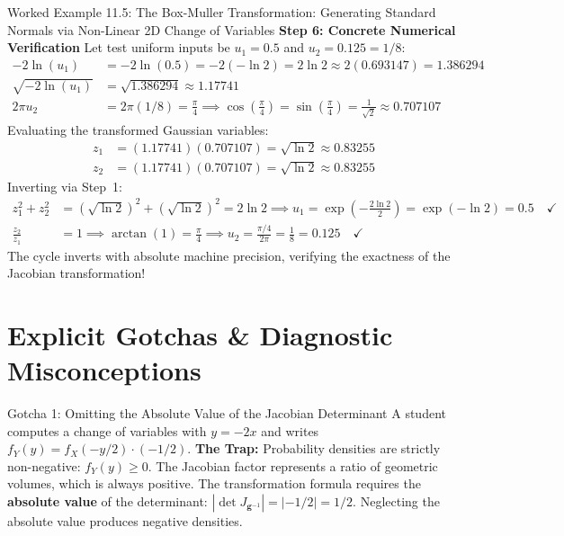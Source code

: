 \begin{examplebox}[breakable]{Worked Example 11.5: The Box-Muller Transformation: Generating Standard Normals via Non-Linear 2D Change of Variables}
\textbf{Step 6: Concrete Numerical Verification}
Let test uniform inputs be $u_1 = 0.5$ and $u_2 = 0.125 = 1/8$:
\begin{align}
-2\ln(u_1) &= -2\ln(0.5) = -2(-\ln 2) = 2\ln 2 \approx 2(0.693147) = 1.386294 \\
\sqrt{-2\ln(u_1)} &= \sqrt{1.386294} \approx 1.17741 \\
2\pi u_2 &= 2\pi(1/8) = \frac{\pi}{4} \implies \cos\left(\frac{\pi}{4}\right) = \sin\left(\frac{\pi}{4}\right) = \frac{1}{\sqrt{2}} \approx 0.707107
\end{align}
Evaluating the transformed Gaussian variables:
\begin{align}
z_1 &= (1.17741)(0.707107) = \sqrt{\ln 2} \approx \mathbf{0.83255} \\
z_2 &= (1.17741)(0.707107) = \sqrt{\ln 2} \approx \mathbf{0.83255}
\end{align}
Inverting via Step~1:
\begin{align}
z_1^2 + z_2^2 &= (\sqrt{\ln 2})^2 + (\sqrt{\ln 2})^2 = 2\ln 2 \implies u_1 = \exp\left(-\frac{2\ln 2}{2}\right) = \exp(-\ln 2) = 0.5 \quad \checkmark \\
\frac{z_2}{z_1} &= 1 \implies \arctan(1) = \frac{\pi}{4} \implies u_2 = \frac{\pi/4}{2\pi} = \frac{1}{8} = 0.125 \quad \checkmark
\end{align}
The cycle inverts with absolute machine precision, verifying the exactness of the Jacobian transformation!
\end{examplebox}

\section{Explicit Gotchas \& Diagnostic Misconceptions}

\begin{trapbox}{Gotcha 1: Omitting the Absolute Value of the Jacobian Determinant}
A student computes a change of variables with $y = -2x$ and writes $f_Y(y) = f_X(-y/2) \cdot (-1/2)$.
\textbf{The Trap:} Probability densities are strictly non-negative: $f_Y(y) \ge 0$. The Jacobian factor represents a ratio of geometric volumes, which is always positive. The transformation formula requires the \textbf{absolute value} of the determinant: $|\det J_{\mathbf{g}^{-1}}| = |-1/2| = 1/2$. Neglecting the absolute value produces negative densities.
\end{trapbox}

